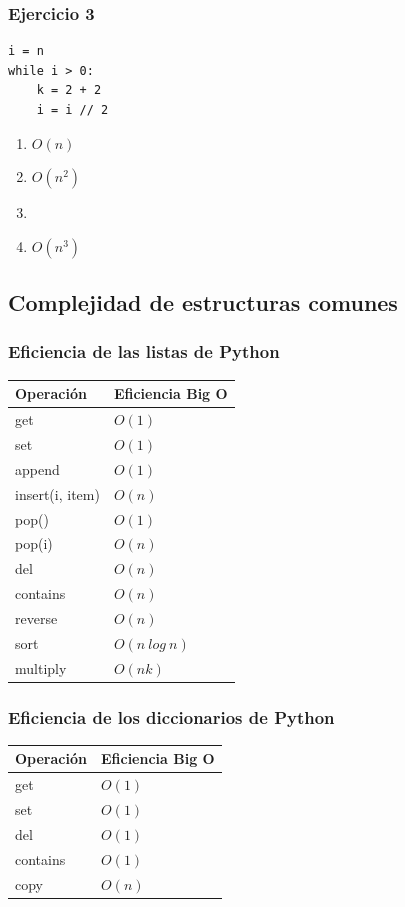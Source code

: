 \documentclass[11pt]{beamer}
\begin{document}
	\begin{frame}[fragile]\frametitle{Ejercicio 3}
	\begin{lstlisting}
i = n
while i > 0:
	k = 2 + 2
	i = i // 2
\end{lstlisting}
	\begin{enumerate}
	\item $O(n)$
	\item $O(n^2)$
	\item  {}
	\item $O(n^3)$
	\end{enumerate}
	\end{frame}

	\subsection{Complejidad de estructuras comunes}

	\begin{frame}\frametitle{Eficiencia de las listas de Python}
	\begin{center}
	\begin{tabular}{l|l}
	\hline
	\textbf{Operación} &\textbf{ Eficiencia Big O} \\
	\hline
	get & $O(1)$ \\
	set & $O(1)$ \\
	append & $O(1)$ \\
	insert(i, item) & $O(n)$ \\
	pop() & $O(1)$ \\
	pop(i) & $O(n)$ \\
	del & $O(n)$ \\
	contains & $O(n)$ \\
	reverse & $O(n)$ \\
	sort & $O(n\ log\ n)$ \\
	multiply & $O(nk)$ \\
	\end{tabular}
	\end{center}
	\end{frame}


	\begin{frame}\frametitle{Eficiencia de los diccionarios de Python}
	\begin{center}
	\begin{tabular}{l|l}
	\hline
	\textbf{Operación} &\textbf{ Eficiencia Big O} \\
	\hline
	get & $O(1)$ \\
	set & $O(1)$ \\
	del & $O(1)$ \\
	contains & $O(1)$ \\
	copy & $O(n)$ \\
	\end{tabular}
	\end{center}
	\end{frame}
\end{document}
